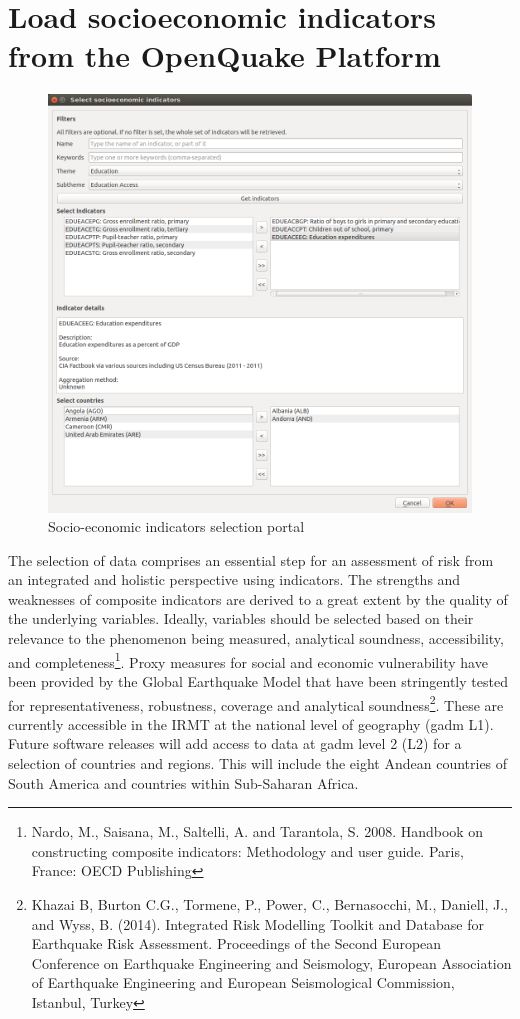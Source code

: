 \section{Load socioeconomic indicators from the OpenQuake Platform}

\begin{figure}
    \centering
    \includegraphics[width=\textwidth]{../images/image23}
    \caption{Socio-economic indicators selection portal}
    \label{fig:load_indicators_from_platform}
\end{figure}

The selection of data comprises an essential step for an assessment of risk
from an integrated and holistic perspective using indicators. The strengths and
weaknesses of composite indicators are derived to a great extent by the quality
of the underlying variables. Ideally, variables should be selected based on
their relevance to the phenomenon being measured, analytical soundness,
accessibility, and completeness\footnote{Nardo, M., Saisana, M., Saltelli, A.
and Tarantola, S. 2008. Handbook on constructing composite indicators:
Methodology and user guide. Paris, France: OECD Publishing}. Proxy measures for
social and economic vulnerability have been provided by the Global Earthquake
Model that have been stringently tested for representativeness, robustness,
coverage and analytical soundness\footnote{Khazai B, Burton C.G., Tormene, P.,
Power, C., Bernasocchi, M., Daniell, J., and Wyss, B. (2014). Integrated Risk
Modelling Toolkit and Database for Earthquake Risk Assessment. Proceedings of
the Second European Conference on Earthquake Engineering and Seismology,
European Association of Earthquake Engineering and European Seismological
Commission, Istanbul, Turkey}. These are currently accessible in the IRMT at
the national level of geography (gadm L1). Future software releases will add
access to data at gadm level 2 (L2) for a selection of countries and regions.
This will include the eight Andean countries of South America and countries
within Sub-Saharan Africa.

